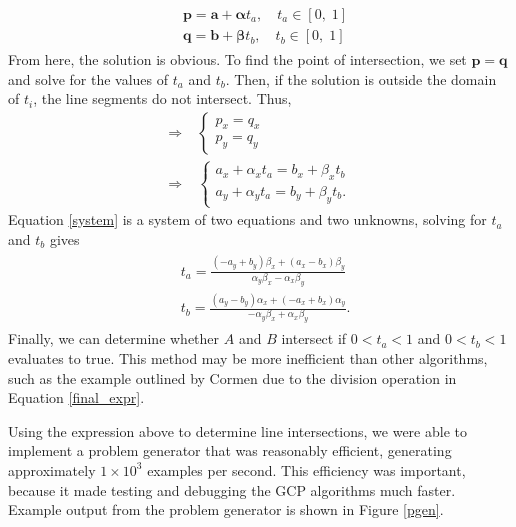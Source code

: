 \documentclass{article}
\newcommand{\ve}[1]{\boldsymbol{\mathbf{#1}}}
\begin{document}
	\begin{align}
		\begin{split}
			& \ve{p} = \ve{a} + \ve{\alpha} t_a, \quad t_a \in [0, \; 1]\\
			& \ve{q} = \ve{b} + \ve{\beta} t_b, \quad t_b \in [0, \; 1]
		\end{split}
	\end{align}
	From here, the solution is obvious. To find the point of intersection, we set $\ve{p} = \ve{q}$ and solve for the values of $t_a$ and $t_b$. Then, if the solution is outside the domain of $t_i$, the line segments do not intersect. Thus,
	\begin{align}
		\Rightarrow \; &\begin{cases}
			p_x = q_x \\
			p_y = q_y
		\end{cases} \\
		\Rightarrow \; & \begin{cases}
			a_x + \alpha_x t_a = b_x + \beta_x t_b \\
			a_y + \alpha_y t_a = b_y + \beta_y t_b.
		\end{cases} \label{system}	
	\end{align}
	Equation \ref{system} is a system of two equations and two unknowns, solving for $t_a$ and $t_b$ gives
	\begin{align}
		\begin{split}
			&t_a = \frac{(-a_y + b_y)\beta_x + (a_x - b_x)\beta_y}{\alpha_y \beta_x - \alpha_x \beta_y} \\
			&t_b = \frac{(a_y - b_y)\alpha_x + (-a_x + b_x)\alpha_y}{-\alpha_y \beta_x + \alpha_x \beta_y}.
		\end{split} \label{final_expr}
	\end{align}
	Finally, we can determine whether $A$ and $B$ intersect if $0 < t_a < 1$ and $0 < t_b < 1$ evaluates to true. This method may be more inefficient than other algorithms, such as the example outlined by Cormen\cite{structs} due to the division operation in Equation \ref{final_expr}. \par 
	Using the expression above to determine line intersections, we were able to implement a problem generator that was reasonably efficient, generating approximately $1\times10^3$ examples per second. This efficiency was important, because it made testing and debugging the GCP algorithms much faster. Example output from the problem generator is shown in Figure \ref{pgen}.
	
\end{document}

